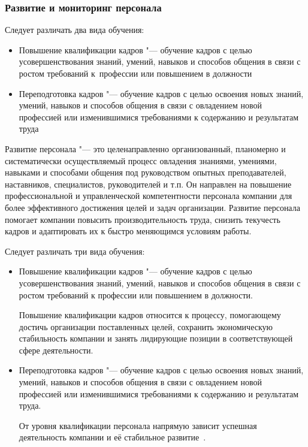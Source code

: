 \documentclass{../industrial-development}
\begin{document}
\begin{frame} \frametitle{Развитие и мониторинг персонала}
  Следует различать два вида обучения:
	\begin{itemize}
		\item \alert{Повышение квалификации кадров} "--- обучение кадров с целью усовершенствования знаний, умений, навыков и способов общения в связи с ростом требований к~профессии или повышением в должности 
	
		\item \alert{Переподготовка кадров} "--- обучение кадров с целью освоения новых знаний, умений, навыков и способов общения в связи с овладением новой профессией или изменившимися требованиями к содержанию и результатам труда
		  
  \end{itemize}
\end{frame}

\lecturenotes

Развитие персонала "--- это целенаправленно организованный, планомерно и систематически осуществляемый процесс овладения знаниями, умениями, навыками и способами общения под руководством опытных преподавателей, наставников, специалистов, руководителей и т.п. Он направлен на повышение профессиональной и управленческой компетентности персонала компании для более эффективного достижения целей и задач организации. Развитие персонала помогает компании повысить производительность труда, снизить текучесть кадров и адаптировать их к быстро меняющимся условиям работы. 

Следует различать три вида обучения:
\begin{itemize}
\item	\alert{Повышение квалификации кадров} "---  обучение кадров с целью усовершенствования знаний, умений, навыков и способов общения в связи с ростом требований к профессии или повышением в должности. 

Повышение квалификации кадров относится к процессу, помогающему достичь организации поставленных целей, сохранить экономическую стабильность компании и занять лидирующие позиции в соответствующей сфере деятельности.

\item	\alert{Переподготовка кадров} "--- обучение кадров с целью освоения новых знаний, умений, навыков и способов общения в связи с овладением новой профессией или изменившимися требованиями к содержанию и результатам труда. 

От уровня квалификации персонала напрямую зависит успешная деятельность компании и её стабильное развитие~\cite[с.~411]{Kibanov}.
  \end{itemize}
\end{document}
